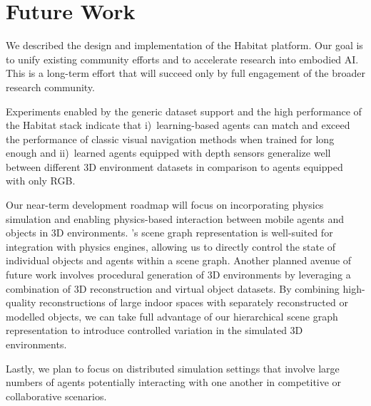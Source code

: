 \section{Future Work}

We described the design and implementation of the Habitat platform. 
Our goal is to unify existing community efforts and to accelerate research into embodied AI.
This is a long-term effort that will succeed only by full engagement of the broader research community.

Experiments enabled by the generic dataset support and the high performance of the Habitat stack indicate that i)~learning-based agents can match and exceed the performance of classic visual navigation methods when trained for long enough and ii)~learned agents equipped with depth sensors generalize well between different 3D environment datasets in comparison to agents equipped with only RGB.

Our near-term development roadmap will focus on incorporating physics simulation and enabling physics-based interaction between mobile agents and objects in 3D environments.
\habitatsim's scene graph representation is well-suited for integration with physics engines, allowing us to directly control the state of individual objects and agents within a scene graph. 
%
%
Another planned avenue of future work involves procedural generation of 3D environments by leveraging a combination of 3D reconstruction and virtual object datasets.
By combining high-quality reconstructions of large indoor spaces with separately reconstructed or modelled objects, we can take full advantage of our hierarchical scene graph representation to introduce controlled variation in the simulated 3D environments.

Lastly, we plan to focus on distributed simulation settings that involve large numbers of agents potentially interacting with one another in competitive or collaborative scenarios.
